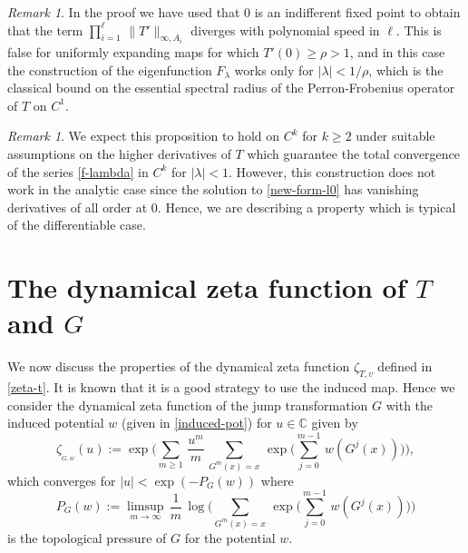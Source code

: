 \documentclass[11pt]{amsart}
\theoremstyle{definition}
\theoremstyle{remark}
\newtheorem{rem}[theorem]{Remark}
\theoremstyle{definition}
\numberwithin{equation}{section}
\newcommand{\C}{\mathbb C}
\newcommand{\dynzeta}[1]{\zeta_{_{#1}}}
\begin{document}
\begin{rem}
In the proof we have used that $0$ is an indifferent fixed point to obtain that the term $\prod_{i=1}^{\ell}\, \| T' \|_{\infty,A_i}$ diverges with polynomial speed in $\ell$. This is false for uniformly expanding maps for which $T'(0)\ge \rho>1$, and in this case the construction of the eigenfunction $F_\lambda$ works only for $|\lambda|<1/\rho$, which is the classical bound on the essential spectral radius of the Perron-Frobenius operator of $T$ on $C^1$. 
\end{rem}

\begin{rem}
We expect this proposition to hold on $C^k$ for $k\ge 2$ under suitable assumptions on the higher derivatives of $T$ which guarantee the total convergence of the series \eqref{f-lambda} in $C^k$ for $|\lambda|<1$. However, this construction does not work in the analytic case since the solution to \eqref{new-form-l0} has vanishing derivatives of all order at 0. Hence, we are describing a property which is typical of the differentiable case.
\end{rem}

\section{The dynamical zeta function of $T$ and $G$} \label{sec:zeta-t}
We now discuss the properties of the dynamical zeta function $\zeta_{T,v}$ defined in \eqref{zeta-t}. It is known that it is a good strategy to use the induced map. Hence we consider the dynamical zeta function of the jump transformation $G$ with the induced potential $w$ (given in \eqref{induced-pot}) for $u\in \C$ given by
\[
\dynzeta{G,w}(u) := \exp \Big( \sum_{m\ge 1}\, \frac{u^m}m\, \sum_{G^m(x)=x}\, \exp\Big(\sum_{j=0}^{m-1}\, w(G^j(x))\Big) \Big),
\]
which converges for $|u|<\exp(-P_G(w))$ where 
\[
P_G(w) := \limsup_{m\to \infty}\, \frac 1m\, \log \Big( \sum_{G^m(x)=x}\, \exp\Big(\sum_{j=0}^{m-1}\, w(G^j(x))\Big) \Big)
\]
is the topological pressure of $G$ for the potential $w$.
\end{document}
